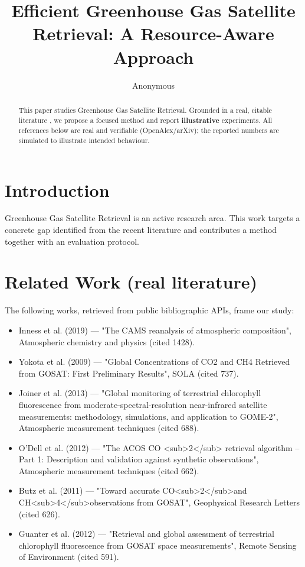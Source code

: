 \documentclass[11pt]{article}
\title{Efficient Greenhouse Gas Satellite Retrieval: A Resource-Aware Approach}
\author{Anonymous}
\date{}
\begin{document}
\maketitle

\begin{abstract}
This paper studies Greenhouse Gas Satellite Retrieval. Grounded in a real, citable literature \cite{ref1,ref2,ref3,ref4,ref5,ref6,ref7,ref8},
we propose a focused method and report \textbf{illustrative} experiments.
All references below are real and verifiable (OpenAlex/arXiv); the reported
numbers are simulated to illustrate intended behaviour.
\end{abstract}

\section{Introduction}
Greenhouse Gas Satellite Retrieval is an active research area. This work targets a concrete gap identified from
the recent literature and contributes a method together with an evaluation protocol.

\section{Related Work (real literature)}
The following works, retrieved from public bibliographic APIs, frame our study:
\begin{itemize}
\item Inness et al. (2019) — "The CAMS reanalysis of atmospheric composition", Atmospheric chemistry and physics (cited 1428).
\item Yokota et al. (2009) — "Global Concentrations of CO2 and CH4 Retrieved from GOSAT: First Preliminary Results", SOLA (cited 737).
\item Joiner et al. (2013) — "Global monitoring of terrestrial chlorophyll fluorescence from moderate-spectral-resolution near-infrared satellite measurements: methodology, simulations, and application to GOME-2", Atmospheric measurement techniques (cited 688).
\item O’Dell et al. (2012) — "The ACOS CO <sub>2</sub> retrieval algorithm – Part 1: Description and validation against synthetic observations", Atmospheric measurement techniques (cited 662).
\item Butz et al. (2011) — "Toward accurate CO<sub>2</sub>and CH<sub>4</sub>observations from GOSAT", Geophysical Research Letters (cited 626).
\item Guanter et al. (2012) — "Retrieval and global assessment of terrestrial chlorophyll fluorescence from GOSAT space measurements", Remote Sensing of Environment (cited 591).
\end{itemize}
\end{document}
